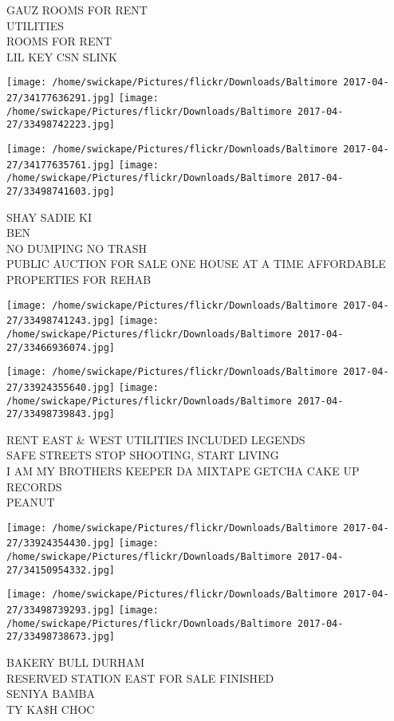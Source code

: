 \documentclass[10pt,letterpaper]{article}
\begin{document}
GAUZ ROOMS FOR RENT\\
UTILITIES\\
ROOMS FOR RENT\\
LIL KEY CSN SLINK\\
\pagebreak

\texttt{[image: /home/swickape/Pictures/flickr/Downloads/Baltimore 2017-04-27/34177636291.jpg]}
\texttt{[image: /home/swickape/Pictures/flickr/Downloads/Baltimore 2017-04-27/33498742223.jpg]}

\texttt{[image: /home/swickape/Pictures/flickr/Downloads/Baltimore 2017-04-27/34177635761.jpg]}
\texttt{[image: /home/swickape/Pictures/flickr/Downloads/Baltimore 2017-04-27/33498741603.jpg]}

SHAY SADIE KI\\
BEN\\
NO DUMPING NO TRASH\\
PUBLIC AUCTION FOR SALE ONE HOUSE AT A TIME AFFORDABLE PROPERTIES FOR REHAB\\
\pagebreak

\texttt{[image: /home/swickape/Pictures/flickr/Downloads/Baltimore 2017-04-27/33498741243.jpg]}
\texttt{[image: /home/swickape/Pictures/flickr/Downloads/Baltimore 2017-04-27/33466936074.jpg]}

\texttt{[image: /home/swickape/Pictures/flickr/Downloads/Baltimore 2017-04-27/33924355640.jpg]}
\texttt{[image: /home/swickape/Pictures/flickr/Downloads/Baltimore 2017-04-27/33498739843.jpg]}

RENT EAST \& WEST UTILITIES INCLUDED LEGENDS\\
SAFE STREETS STOP SHOOTING, START LIVING\\
I AM MY BROTHERS KEEPER DA MIXTAPE GETCHA CAKE UP RECORDS\\
PEANUT\\
\pagebreak

\texttt{[image: /home/swickape/Pictures/flickr/Downloads/Baltimore 2017-04-27/33924354430.jpg]}
\texttt{[image: /home/swickape/Pictures/flickr/Downloads/Baltimore 2017-04-27/34150954332.jpg]}

\texttt{[image: /home/swickape/Pictures/flickr/Downloads/Baltimore 2017-04-27/33498739293.jpg]}
\texttt{[image: /home/swickape/Pictures/flickr/Downloads/Baltimore 2017-04-27/33498738673.jpg]}

BAKERY BULL DURHAM\\
RESERVED STATION EAST FOR SALE FINISHED\\
SENIYA BAMBA\\
TY KA\$H CHOC\\
\pagebreak
\end{document}

